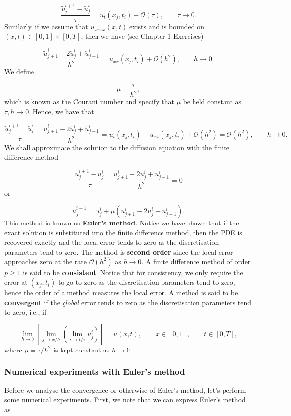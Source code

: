 \documentclass[12pt,a4paper]{article}
\begin{document}
\[
\frac{\tilde{u}^{i+1}_j - \tilde{u}^i_j}{\tau} = u_t(x_j,t_i) + \mathcal{O}(\tau), \qquad \tau \to 0.
\]
Similarly, if we assume that $u_{xxxx}(x,t)$ exists and is bounded on $(x,t) \in [0,1]\times[0,T]$, then we have (see Chapter 1 Exercises)

\[
\frac{\tilde{u}^{i}_{j+1} - 2\tilde{u}^i_j + \tilde{u}^i_{j-1}}{h^2} = u_{xx}(x_j,t_i) + \mathcal{O}(h^2), \qquad h \to 0.
\]
We define

\[
\mu = \frac{\tau}{h^2},
\]
which is known as the Courant number and specify that $\mu$ be held constant as $\tau, h \to 0$. Hence, we have that

\[
\frac{\tilde{u}^{i+1}_j - \tilde{u}^i_j}{\tau} - \frac{\tilde{u}^{i}_{j+1} - 2\tilde{u}^i_j + \tilde{u}^i_{j-1}}{h^2} = u_t(x_j,t_i) - u_{xx}(x_j,t_i) + \mathcal{O}(h^2) =  \mathcal{O}(h^2), \qquad h \to 0.
\]
We shall approximate the solution to the diffusion equation with the finite difference method

\[
\frac{u^{i+1}_j - u^i_j}{\tau} - \frac{u^{i}_{j+1} - 2u^i_j + u^i_{j-1}}{h^2} = 0
\]
or

\[
u^{i+1}_j = u^i_j + \mu \left( u^{i}_{j+1} - 2u^i_j + u^i_{j-1}  \right).
\]
This method is known as \textbf{Euler's method}. Notice we have shown that if the exact solution is substituted into the finite difference method, then the PDE is recovered exactly and the local error tends to zero as the discretisation parameters tend to zero.  The method is \textbf{second order} since the local error approaches zero at the rate $\mathcal{O}(h^2)$ as $h \to 0$. A finite difference method of order $p \geq 1$ is said to be \textbf{consistent}.  Notice that for consistency, we only require the error at $(x_j,t_i)$  to go to zero as the discretisation parameters tend to zero, hence the order of a method measures the local error.  A method is said to be \textbf{convergent} if the \emph{global} error tends to zero as the discretisation parameters tend to zero, i.e., if

\[
\lim_{h \to 0}\left[\lim_{j \to x/h}\left( \lim_{i \to t/\tau} u^i_j \right)   \right] = u(x,t), \qquad x \in [0, 1], \qquad t \in [0, T],
\]
where $\mu = \tau/h^2$ is kept constant as $h \to 0$.

\subsubsection{Numerical experiments with Euler's method}
Before we analyse the convergence or otherwise of Euler's method, let's perform some numerical experiments.  First, we note that we can express Euler's method as
\end{document}
